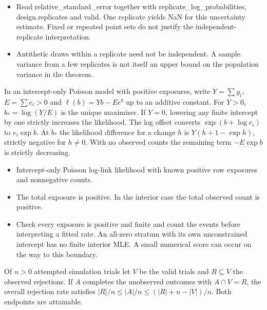 \expandafter\def\csname statadic@diagnostics@STATADIC-INTEGRATION-002\endcsname{\begin{itemize}
\item Read relative\_standard\_error together with replicate\_log\_probabilities, design.replicates and valid. One replicate yields NaN for this uncertainty estimate. Fixed or repeated point sets do not justify the independent-replicate interpretation.
\item Antithetic draws within a replicate need not be independent. A sample variance from a few replicates is not itself an upper bound on the population variance in the theorem.
\end{itemize}}
\expandafter\def\csname statadic@statement@STATADIC-POISSON-001\endcsname{In an intercept-only Poisson model with positive exposures, write
  $Y=\sum y_i$, $E=\sum e_i>0$ and $\ell(b)=Yb-Ee^b$ up to an additive constant.
  For $Y>0$, $b_*=\log(Y/E)$ is the unique maximizer. If $Y=0$, lowering any
  finite intercept by one strictly increases the likelihood.}
\expandafter\def\csname statadic@proof@STATADIC-POISSON-001\endcsname{The log offset converts $\exp(b+\log e_i)$ to $e_i\exp b$.
  At $b_*$ the likelihood difference for a change $h$ is
  $Y(h+1-\exp h)$, strictly negative for $h\ne0$.
  With no observed counts the remaining term $-E\exp b$ is strictly decreasing.}
\expandafter\def\csname statadic@assumptions@STATADIC-POISSON-001\endcsname{\begin{itemize}
\item Intercept-only Poisson log-link likelihood with known positive row exposures and nonnegative counts.
\item The total exposure is positive. In the interior case the total observed count is positive.
\end{itemize}}
\expandafter\def\csname statadic@diagnostics@STATADIC-POISSON-001\endcsname{\begin{itemize}
\item Check every exposure is positive and finite and count the events before interpreting a fitted rate. An all-zero stratum with its own unconstrained intercept has no finite interior MLE. A small numerical score can occur on the way to this boundary.
\end{itemize}}
\expandafter\def\csname statadic@statement@STATADIC-QUALIFICATION-001\endcsname{Of $n>0$ attempted simulation trials let $V$ be the valid trials
  and $R\subseteq V$ the observed rejections. If $A$ completes the unobserved outcomes
  with $A\cap V=R$, the overall rejection rate satisfies
  $|R|/n\le |A|/n\le(|R|+n-|V|)/n$. Both endpoints are attainable.}
